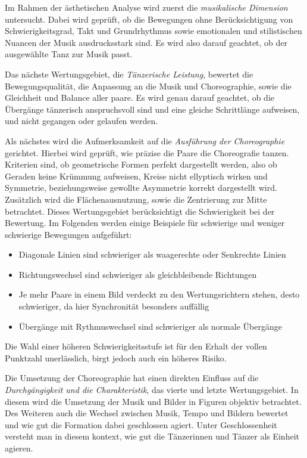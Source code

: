 \documentclass[
  ngerman,
  a4paper,  %
  twoside,  %
  bibliography=totoc,
  headsepline,
  cleardoublepage=empty,
  parskip=half,
  draft=false
]{scrbook}
\begin{document}
Im Rahmen der ästhetischen Analyse wird zuerst die \textit{musikalische Dimension} untersucht.
Dabei wird geprüft, ob die Bewegungen ohne Berücksichtigung von Schwierigkeitsgrad, Takt und Grundrhythmus sowie emotionalen und stilistischen Nuancen der Musik ausdrucksstark sind.
Es wird also darauf geachtet, ob der ausgewählte Tanz zur Musik passt.

Das nächste Wertungsgebiet, die \textit{Tänzerische Leistung}, bewertet die Bewegungsqualität, die Anpassung an die Musik und Choreographie, sowie die Gleichheit und Balance aller paare.
Es wird genau darauf geachtet, ob die Übergänge tänzerisch anspruchsvoll sind und eine gleiche Schrittlänge aufweisen, und nicht gegangen oder gelaufen werden.

Als nächstes wird die Aufmerksamkeit auf die \textit{Ausführung der Choreographie} gerichtet.
Hierbei wird geprüft, wie präzise die Paare die Choreografie tanzen.
Kriterien sind, ob geometrische Formen perfekt dargestellt werden, also ob Geraden keine Krümmung aufweisen, Kreise nicht ellyptisch wirken und Symmetrie, beziehungsweise gewollte Asymmetrie korrekt dargestellt wird. Zusätzlich wird die Flächenausnutzung, sowie die Zentrierung zur Mitte betrachtet. Dieses Wertungsgebiet berücksichtigt die Schwierigkeit bei der Bewertung. Im Folgenden werden einige Beispiele für schwierige und weniger schwierige Bewegungen aufgeführt:
\begin{itemize}
  \item Diagonale Linien sind schwieriger als waagerechte oder Senkrechte Linien
  \item Richtungswechsel sind schwieriger als gleichbleibende Richtungen
  \item Je mehr Paare in einem Bild verdeckt zu den Wertungsrichtern stehen, desto schwieriger, da hier Synchronität besonders auffällig
  \item Übergänge mit Rythmuswechsel sind schwieriger als normale Übergänge
\end{itemize}
Die Wahl einer höheren Schwierigkeitsstufe ist für den Erhalt der vollen Punktzahl unerlässlich, birgt jedoch auch ein höheres Risiko.

Die Umsetzung der Choreographie hat einen direkten Einfluss auf die \textit{Durchgängigkeit und die Charakteristik}, das vierte und letzte Wertungsgebiet.
In diesem wird die Umsetzung der Musik und Bilder in Figuren objektiv betrachtet.
Des Weiteren auch die Wechsel zwischen Musik, Tempo und Bildern bewertet und wie gut die Formation dabei geschlossen agiert.
Unter Geschlossenheit versteht man in diesem kontext, wie gut die Tänzerinnen und Tänzer als Einheit agieren.
\end{document}
